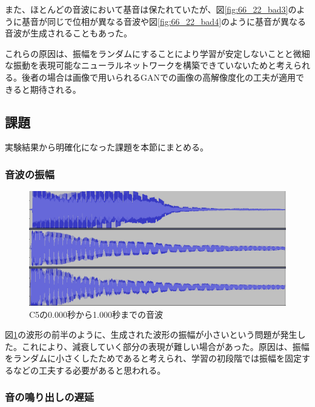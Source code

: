 また、ほとんどの音波において基音は保たれていたが、図\ref{fig:66_22_bad3}のように基音が同じで位相が異なる音波や図\ref{fig:66_22_bad4}のように基音が異なる音波が生成されることもあった。

これらの原因は、振幅をランダムにすることにより学習が安定しないことと微細な振動を表現可能なニューラルネットワークを構築できていないためと考えられる。後者の場合は画像で用いられるGANでの画像の高解像度化の工夫が適用できると期待される。


\subsection{課題}

実験結果から明確化になった課題を本節にまとめる。

\subsubsection{音波の振幅}

\begin{figure}[b]
\begin{center}
\includegraphics[width=0.7\hsize]{figure/88_88/c5.png}
\caption{C5の0.000秒から1.000秒までの音波}
\label{fig:88_88_amp}
\end{center}
\end{figure}

図\ref{fig:88_88_amp}の波形の前半のように、生成された波形の振幅が小さいという問題が発生した。これにより、減衰していく部分の表現が難しい場合があった。原因は、振幅をランダムに小さくしたためであると考えられ、学習の初段階では振幅を固定するなどの工夫する必要があると思われる。
    
\subsubsection{音の鳴り出しの遅延}


